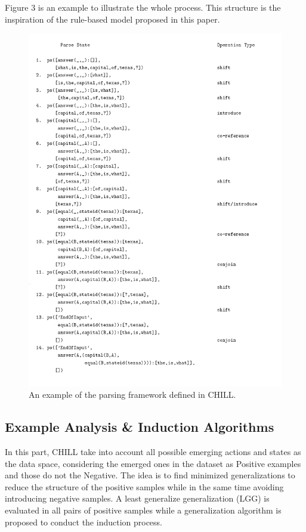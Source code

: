 \documentclass[11pt,a4paper]{article}
\begin{document}
Figure 3 is an example to illustrate the whole process. This structure is the inspiration of the rule-based model proposed in this paper.

\begin{figure}[ht]
\vskip 0.2in
\label{fig3}
\begin{center}
\centerline{\includegraphics[width=\columnwidth]{fig3}}
\caption{An example of the parsing framework defined in CHILL.}
\end{center}
\vskip -0.2in
\end{figure}

\subsection{Example Analysis \& Induction Algorithms}

In this part, CHILL take into account all possible emerging actions and states as the data space, considering the emerged ones in the dataset as Positive examples and those do not the Negative. The idea is to find minimized generalizations to reduce the structure of the positive samples while in the same time avoiding introducing negative samples. A least generalize generalization (LGG) is evaluated in all pairs of positive samples while a generalization algorithm is proposed to conduct the induction process.
\end{document}
